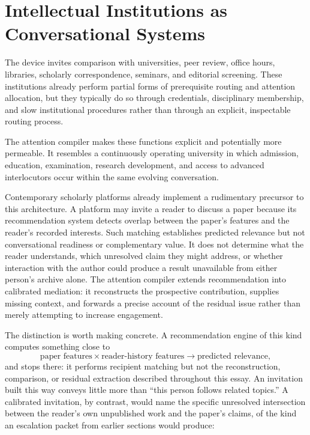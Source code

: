 \documentclass[11pt]{article}
\begin{document}
\section{Intellectual Institutions as Conversational Systems}

The device invites comparison with universities, peer review, office hours, libraries, scholarly correspondence, seminars, and editorial screening. These institutions already perform partial forms of prerequisite routing and attention allocation, but they typically do so through credentials, disciplinary membership, and slow institutional procedures rather than through an explicit, inspectable routing process.

The attention compiler makes these functions explicit and potentially more permeable. It resembles a continuously operating university in which admission, education, examination, research development, and access to advanced interlocutors occur within the same evolving conversation.

Contemporary scholarly platforms already implement a rudimentary precursor to this architecture. A platform may invite a reader to discuss a paper because its recommendation system detects overlap between the paper's features and the reader's recorded interests. Such matching establishes predicted relevance but not conversational readiness or complementary value. It does not determine what the reader understands, which unresolved claim they might address, or whether interaction with the author could produce a result unavailable from either person's archive alone. The attention compiler extends recommendation into calibrated mediation: it reconstructs the prospective contribution, supplies missing context, and forwards a precise account of the residual issue rather than merely attempting to increase engagement.

The distinction is worth making concrete. A recommendation engine of this kind computes something close to
\[
\text{paper features} \times \text{reader-history features} \rightarrow \text{predicted relevance},
\]
and stops there: it performs recipient matching but not the reconstruction, comparison, or residual extraction described throughout this essay. An invitation built this way conveys little more than ``this person follows related topics.'' A calibrated invitation, by contrast, would name the specific unresolved intersection between the reader's own unpublished work and the paper's claims, of the kind an escalation packet from earlier sections would produce:
\end{document}
